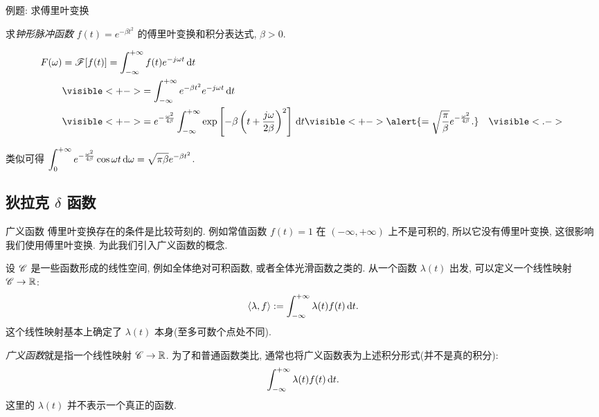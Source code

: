 \begin{frame}{例题: 求傅里叶变换}
	\onslide<+->
	\begin{example}
		求\emph{钟形脉冲函数} $f(t)=e^{-\beta t^2}$ 的傅里叶变换和积分表达式, $\beta>0$.
	\end{example}
	
	\onslide<+->
	\begin{solution}
		\vspace{-\baselineskip}
		\begin{align*}
			F(\omega)&=\msf[f(t)]=\int_{-\infty}^{+\infty}f(t)e^{-j\omega t}\diff t\\
			&\visible<+->{=\int_{-\infty}^{+\infty}e^{-\beta t^2}e^{-j\omega t}\diff t}\\
			&\visible<+->{=e^{-\frac{\omega^2}{4\beta}}\int_{-\infty}^{+\infty}\exp\left[-\beta\left(t+\frac{j\omega}{2\beta}\right)^2\right]\diff t}
			\visible<+->{\alert{=\sqrt{\frac\pi\beta}e^{-\frac{\omega^2}{4\beta}}.}}&\visible<.->{}
		\end{align*}
	\end{solution}

	\onslide<+->
	类似可得
	$\displaystyle\int_0^{+\infty}e^{-\frac{\omega^2}{4\beta}}\cos\omega t\,\mathrm{d}\omega=\sqrt{\pi\beta}e^{-\beta t^2}$.
\end{frame}


\subsection{狄拉克 \texorpdfstring{$\delta$}{δ} 函数}

\begin{frame}{广义函数}
	\onslide<+->
	傅里叶变换存在的条件是比较苛刻的.
	\onslide<+->
	例如常值函数 $f(t)=1$ 在 $(-\infty,+\infty)$ 上不是可积的, 所以它没有傅里叶变换, 这很影响我们使用傅里叶变换.
	\onslide<+->
	为此我们引入广义函数的概念.

	\onslide<+->
	设 $\mathscr{C}$ 是一些函数形成的线性空间, 例如全体绝对可积函数, 或者全体光滑函数之类的. 
	\onslide<+->
	从一个函数 $\lambda(t)$ 出发, 可以定义一个线性映射 $\mathscr{C}\to {\mathbb{R}}$:
	\[\langle{\lambda,f}\rangle:=\int_{-\infty}^{+\infty}\lambda(t)f(t)\,\mathrm{d} t.\]
	\onslide<+->
	这个线性映射基本上确定了 $\lambda(t)$ 本身(至多可数个点处不同).

	\onslide<+->
	\emph{广义函数}就是指一个线性映射 $\mathscr{C}\to {\mathbb{R}}$.
	\onslide<+->
	为了和普通函数类比, 通常也将广义函数表为上述积分形式(并不是真的积分):
	\[\int_{-\infty}^{+\infty}\lambda(t)f(t)\,\mathrm{d} t.\]
	这里的 $\lambda(t)$ 并不表示一个真正的函数.
\end{frame}


